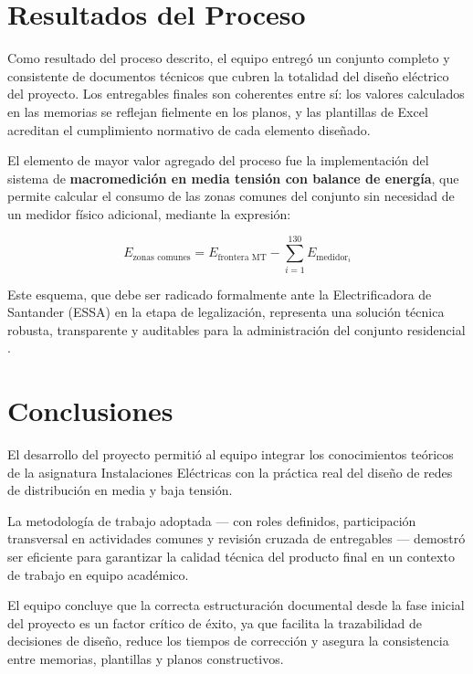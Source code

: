 \section{Resultados del Proceso}

Como resultado del proceso descrito, el equipo entreg\'o un
conjunto completo y consistente de documentos t\'ecnicos que
cubren la totalidad del dise\~no el\'ectrico del proyecto.
Los entregables finales son coherentes entre s\'i: los valores
calculados en las memorias se reflejan fielmente en los planos,
y las plantillas de Excel acreditan el cumplimiento normativo
de cada elemento dise\~nado.

El elemento de mayor valor agregado del proceso fue la
implementaci\'on del sistema de \textbf{macromedici\'on en
media tensi\'on con balance de energ\'ia}, que permite calcular
el consumo de las zonas comunes del conjunto sin necesidad de
un medidor f\'isico adicional, mediante la expresi\'on:

\begin{equation}
  E_{\text{zonas comunes}} =
    E_{\text{frontera MT}} -
    \sum_{i=1}^{130} E_{\text{medidor}_i}
\end{equation}

Este esquema, que debe ser radicado formalmente ante la
Electrificadora de Santander (ESSA) en la etapa de
legalizaci\'on, representa una soluci\'on t\'ecnica robusta,
transparente y auditables para la administraci\'on del
conjunto residencial \citep{essa2020}.

\section{Conclusiones}

El desarrollo del proyecto permiti\'o al equipo integrar los
conocimientos te\'oricos de la asignatura Instalaciones
El\'ectricas con la pr\'actica real del dise\~no de redes de
distribuci\'on en media y baja tensi\'on.

La metodolog\'ia de trabajo adoptada --- con roles definidos,
participaci\'on transversal en actividades comunes y revisi\'on
cruzada de entregables --- demostr\'o ser eficiente para
garantizar la calidad t\'ecnica del producto final en un
contexto de trabajo en equipo acad\'emico.

El equipo concluye que la correcta estructuraci\'on documental
desde la fase inicial del proyecto es un factor cr\'itico
de \'exito, ya que facilita la trazabilidad de decisiones
de dise\~no, reduce los tiempos de correcci\'on y asegura
la consistencia entre memorias, plantillas y planos
constructivos.